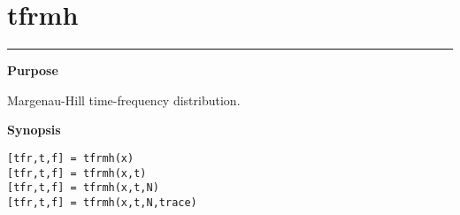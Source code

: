 

\section*{\hspace*{-1.6cm} tfrmh}

\vspace*{-.4cm}
\hspace*{-1.6cm}\rule[0in]{16.5cm}{.02cm}
\vspace*{.2cm}

{\bf \large \sf Purpose}\\
\hspace*{1.5cm}
\begin{minipage}[t]{13.5cm}
Margenau-Hill time-frequency distribution.
\end{minipage}
\vspace*{.2cm}

{\bf \large \sf Synopsis}\\
\hspace*{1.5cm}
\begin{minipage}[t]{13.5cm}
\begin{verbatim}
[tfr,t,f] = tfrmh(x)
[tfr,t,f] = tfrmh(x,t)
[tfr,t,f] = tfrmh(x,t,N)
[tfr,t,f] = tfrmh(x,t,N,trace)
\end{verbatim}
\end{minipage}
\vspace*{.3cm}

